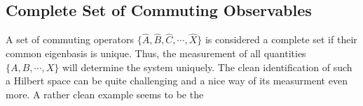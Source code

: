 \subsection{Complete Set of Commuting Observables}

A set of commuting operators $\{\hat{A},\hat{B},\hat{C},\cdots,\hat{X}\}$ is considered a complete set if their common eigenbasis is 				unique. Thus, the measurement of all quantities $\{A,B,\cdots,X\}$ will determine the system uniquely. The clean identification of such a Hilbert space can be quite challenging and a nice way of its measurment even more. A rather clean example seems to be the 
